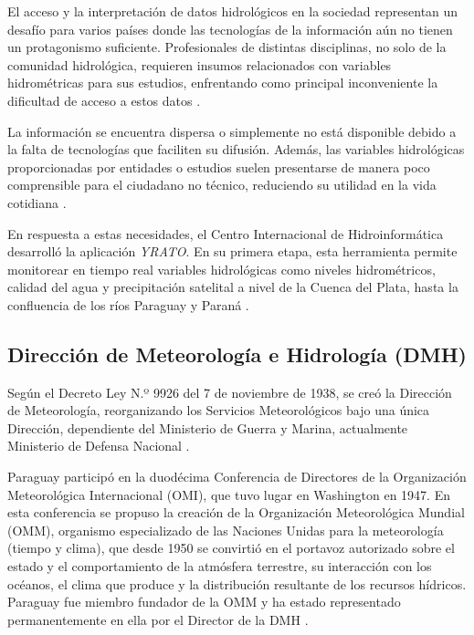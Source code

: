 El acceso y la interpretación de datos hidrológicos en la sociedad representan un desafío para varios países donde las tecnologías de la información aún no tienen un protagonismo suficiente. Profesionales de distintas disciplinas, no solo de la comunidad hidrológica, requieren insumos relacionados con variables hidrométricas para sus estudios, enfrentando como principal inconveniente la dificultad de acceso a estos datos \cite{VV18}.  

La información se encuentra dispersa o simplemente no está disponible debido a la falta de tecnologías que faciliten su difusión. Además, las variables hidrológicas proporcionadas por entidades o estudios suelen presentarse de manera poco comprensible para el ciudadano no técnico, reduciendo su utilidad en la vida cotidiana \cite{VV18}.  

En respuesta a estas necesidades, el Centro Internacional de Hidroinformática desarrolló la aplicación \textit{YRATO}. En su primera etapa, esta herramienta permite monitorear en tiempo real variables hidrológicas como niveles hidrométricos, calidad del agua y precipitación satelital a nivel de la Cuenca del Plata, hasta la confluencia de los ríos Paraguay y Paraná \cite{yrato-link, VV18, CON20}.

\subsection{Dirección de Meteorología e Hidrología (DMH)}

Según el Decreto Ley N.º 9926 del 7 de noviembre de 1938, se creó la Dirección de Meteorología, reorganizando los Servicios Meteorológicos bajo una única Dirección, dependiente del Ministerio de Guerra y Marina, actualmente Ministerio de Defensa Nacional \cite{DMH23b}.  

Paraguay participó en la duodécima Conferencia de Directores de la Organización Meteorológica Internacional (OMI), que tuvo lugar en Washington en 1947. En esta conferencia se propuso la creación de la Organización Meteorológica Mundial (OMM), organismo especializado de las Naciones Unidas para la meteorología (tiempo y clima), que desde 1950 se convirtió en el portavoz autorizado sobre el estado y el comportamiento de la atmósfera terrestre, su interacción con los océanos, el clima que produce y la distribución resultante de los recursos hídricos. Paraguay fue miembro fundador de la OMM y ha estado representado permanentemente en ella por el Director de la DMH \cite{DMH23b}.  

